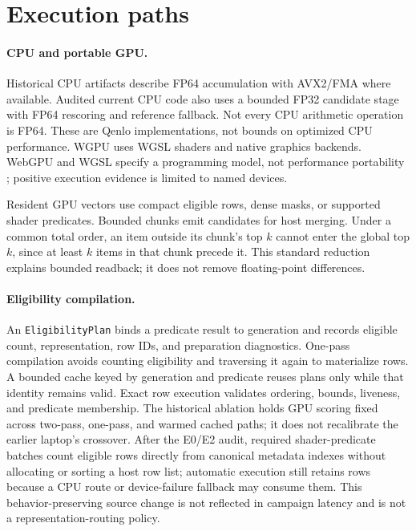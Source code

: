 \documentclass[10pt]{article}
\begin{document}
\section{Execution paths}
\paragraph{CPU and portable GPU.}
Historical CPU artifacts describe FP64 accumulation with AVX2/FMA where available. Audited current CPU code also uses a bounded FP32 candidate stage with FP64 rescoring and reference fallback. Not every CPU arithmetic operation is FP64. These are Qenlo implementations, not bounds on optimized CPU performance. WGPU uses WGSL shaders and native graphics backends. WebGPU and WGSL specify a programming model, not performance portability \citep{webgpu,wgsl}; positive execution evidence is limited to named devices.

Resident GPU vectors use compact eligible rows, dense masks, or supported shader predicates. Bounded chunks emit candidates for host merging. Under a common total order, an item outside its chunk's top $k$ cannot enter the global top $k$, since at least $k$ items in that chunk precede it. This standard reduction explains bounded readback; it does not remove floating-point differences.

\paragraph{Eligibility compilation.}
An \texttt{EligibilityPlan} binds a predicate result to generation and records eligible count, representation, row IDs, and preparation diagnostics. One-pass compilation avoids counting eligibility and traversing it again to materialize rows. A bounded cache keyed by generation and predicate reuses plans only while that identity remains valid. Exact row execution validates ordering, bounds, liveness, and predicate membership. The historical ablation holds GPU scoring fixed across two-pass, one-pass, and warmed cached paths; it does not recalibrate the earlier laptop's crossover.
After the E0/E2 audit, required shader-predicate batches count eligible rows directly from canonical metadata indexes without allocating or sorting a host row list; automatic execution still retains rows because a CPU route or device-failure fallback may consume them. This behavior-preserving source change is not reflected in campaign latency and is not a representation-routing policy.
\end{document}
